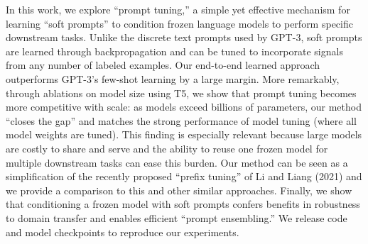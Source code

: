 In this work, we explore ``prompt tuning,'' a simple yet effective mechanism for learning ``soft prompts'' to condition frozen language models to perform specific downstream tasks. Unlike the discrete text prompts used by GPT-3, soft prompts are learned through backpropagation and can be tuned to incorporate signals from any number of labeled examples. Our end-to-end learned approach outperforms GPT-3's few-shot learning by a large margin. More remarkably, through ablations on model size using T5, we show that prompt tuning becomes more competitive with scale: as models exceed billions of parameters, our method ``closes the gap'' and matches the strong performance of model tuning (where all model weights are tuned). This finding is especially relevant because large models are costly to share and serve and the ability to reuse one frozen model for multiple downstream tasks can ease this burden. Our method can be seen as a simplification of the recently proposed ``prefix tuning'' of Li and Liang (2021) and we provide a comparison to this and other similar approaches. Finally, we show that conditioning a frozen model with soft prompts confers benefits in robustness to domain transfer and enables efficient ``prompt ensembling.'' We release code and model checkpoints to reproduce our experiments.
